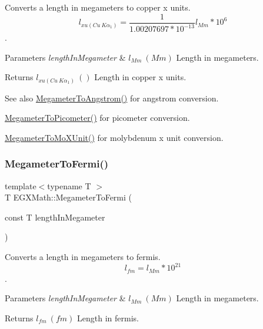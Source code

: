 Converts a length in megameters to copper x units. \[ l_{xu(Cu\ K\alpha_1)}= \frac{1}{1.00207697*10^{-13}} l_{Mm} * 10^{6}\]. 


\begin{DoxyParams}{Parameters}
{\em length\+In\+Megameter} & $ l_{Mm}\ (Mm)$ Length in megameters. \\
\hline
\end{DoxyParams}
\begin{DoxyReturn}{Returns}
$ l_{xu(Cu\ K\alpha_1)}\ ()$ Length in copper x units. 
\end{DoxyReturn}
\begin{DoxySeeAlso}{See also}
\mbox{\hyperlink{group___e_g_x_math-_conversions-_length_conversions-_megameter-_non-_s_i_gac4c7e615f4ec3d000ac341a5bf9a79a0}{Megameter\+To\+Angstrom()}} for angstrom conversion. 

\mbox{\hyperlink{group___e_g_x_math-_conversions-_length_conversions-_megameter-_s_i_ga0f6585bdcd16b6748b6c4d9116dd955c}{Megameter\+To\+Picometer()}} for picometer conversion. 

\mbox{\hyperlink{group___e_g_x_math-_conversions-_length_conversions-_megameter-_non-_s_i_ga134a9fb2603b93c739c4ee58864f69c6}{Megameter\+To\+Mo\+X\+Unit()}} for molybdenum x unit conversion. 
\end{DoxySeeAlso}
\mbox{\label{group___e_g_x_math-_conversions-_length_conversions-_megameter-_non-_s_i_ga74f07a7c24ffe784415fb3d33a3b5bec}} 
\subsubsection{\texorpdfstring{Megameter\+To\+Fermi()}{MegameterToFermi()}}
{\footnotesize\ttfamily template$<$typename T $>$ \\
T E\+G\+X\+Math\+::\+Megameter\+To\+Fermi (\begin{DoxyParamCaption}\item[{const T}]{length\+In\+Megameter }\end{DoxyParamCaption})}



Converts a length in megameters to fermis. \[ l_{fm}=l_{Mm} * 10^{21} \]. 


\begin{DoxyParams}{Parameters}
{\em length\+In\+Megameter} & $ l_{Mm}\ (Mm)$ Length in megameters. \\
\hline
\end{DoxyParams}
\begin{DoxyReturn}{Returns}
$ l_{fm}\ (fm)$ Length in fermis. 
\end{DoxyReturn}
\mbox{\label{group___e_g_x_math-_conversions-_length_conversions-_megameter-_non-_s_i_ga14e6b356b28257b1bde9cb9ebf6bc3c6}} 
